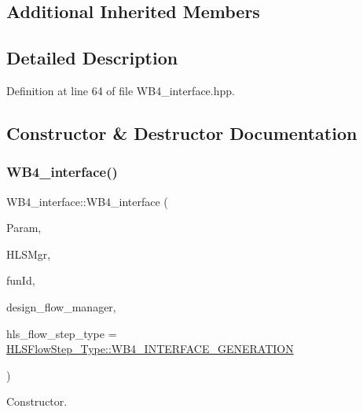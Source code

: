 \subsection*{Additional Inherited Members}


\subsection{Detailed Description}


Definition at line 64 of file W\+B4\+\_\+interface.\+hpp.



\subsection{Constructor \& Destructor Documentation}
\mbox{\label{classWB4__interface_a39e36195577d336179b46567f1d18941}} 
\subsubsection{\texorpdfstring{W\+B4\+\_\+interface()}{WB4\_interface()}}
{\footnotesize\ttfamily W\+B4\+\_\+interface\+::\+W\+B4\+\_\+interface (\begin{DoxyParamCaption}\item[{const \hyperlink{Parameter_8hpp_a37841774a6fcb479b597fdf8955eb4ea}{Parameter\+Const\+Ref}}]{Param,  }\item[{const \hyperlink{hls__manager_8hpp_acd3842b8589fe52c08fc0b2fcc813bfe}{H\+L\+S\+\_\+manager\+Ref}}]{H\+L\+S\+Mgr,  }\item[{unsigned int}]{fun\+Id,  }\item[{const Design\+Flow\+Manager\+Const\+Ref}]{design\+\_\+flow\+\_\+manager,  }\item[{const \hyperlink{hls__step_8hpp_ada16bc22905016180e26fc7e39537f8d}{H\+L\+S\+Flow\+Step\+\_\+\+Type}}]{hls\+\_\+flow\+\_\+step\+\_\+type = {\ttfamily \hyperlink{hls__step_8hpp_ada16bc22905016180e26fc7e39537f8da753afa41e94e46c228dbc418b09406af}{H\+L\+S\+Flow\+Step\+\_\+\+Type\+::\+W\+B4\+\_\+\+I\+N\+T\+E\+R\+F\+A\+C\+E\+\_\+\+G\+E\+N\+E\+R\+A\+T\+I\+ON}} }\end{DoxyParamCaption})}



Constructor. 

